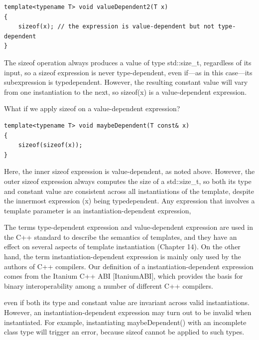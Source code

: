 \begin{lstlisting}[style=styleCXX]
template<typename T> void valueDependent2(T x)
{
	sizeof(x); // the expression is value-dependent but not type-dependent
}
\end{lstlisting}

The sizeof operation always produces a value of type std::size\_t, regardless of its input, so a sizeof expression is never type-dependent, even if—as in this case—its subexpression is typedependent. However, the resulting constant value will vary from one instantiation to the next, so sizeof(x) is a value-dependent expression.

What if we apply sizeof on a value-dependent expression?

\begin{lstlisting}[style=styleCXX]
template<typename T> void maybeDependent(T const& x)
{
	sizeof(sizeof(x));
}
\end{lstlisting}

Here, the inner sizeof expression is value-dependent, as noted above. However, the outer sizeof expression always computes the size of a std::size\_t, so both its type and constant value are consistent across all instantiations of the template, despite the innermost expression (x) being typedependent. Any expression that involves a template parameter is an instantiation-dependent expression,

\begin{tcolorbox}[colback=webgreen!5!white,colframe=webgreen!75!black]
\hspace*{0.75cm}The terms type-dependent expression and value-dependent expression are used in the C++ standard to describe the semantics of templates, and they have an effect on several aspects of template instantiation (Chapter 14). On the other hand, the term instantiation-dependent expression is mainly only used by the authors of C++ compilers. Our definition of a instantiation-dependent expression comes from the Itanium C++ ABI [ItaniumABI], which provides the basis for binary interoperability among a number of different C++ compilers.
\end{tcolorbox}

even if both its type and constant value are invariant across valid instantiations. However, an instantiation-dependent expression may turn out to be invalid when instantiated. For example, instantiating maybeDependent() with an incomplete class type will trigger an error, because sizeof cannot be applied to such types.

